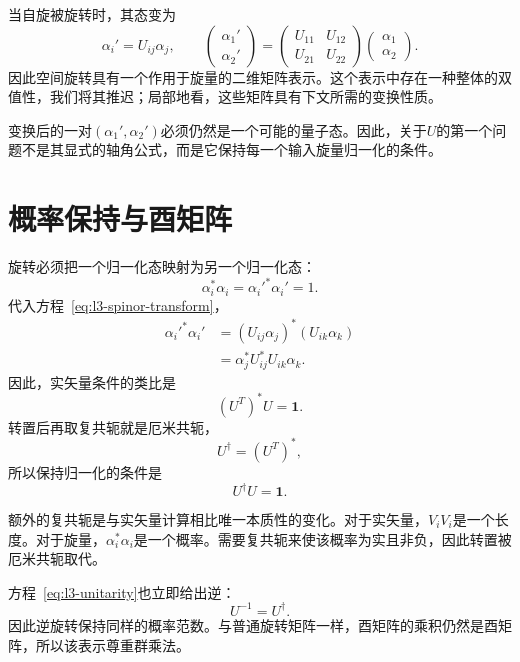 当自旋被旋转时，其态变为
\begin{equation}
\alpha_i'=U_{ij}\alpha_j,
\qquad
\begin{pmatrix}\alpha_1'\\\alpha_2'\end{pmatrix}
=
\begin{pmatrix}
U_{11}&U_{12}\\
U_{21}&U_{22}
\end{pmatrix}
\begin{pmatrix}\alpha_1\\\alpha_2\end{pmatrix}.
\label{eq:l3-spinor-transform}
\end{equation}
因此空间旋转具有一个作用于旋量的二维矩阵表示。这个表示中存在一种整体的双值性，我们将其推迟；局部地看，这些矩阵具有下文所需的变换性质。

变换后的一对\((\alpha_1',\alpha_2')\)必须仍然是一个可能的量子态。因此，关于\(U\)的第一个问题不是其显式的轴角公式，而是它保持每一个输入旋量归一化的条件。

\section{概率保持与酉矩阵}

旋转必须把一个归一化态映射为另一个归一化态：
\begin{equation}
\alpha_i^*\alpha_i=\alpha_i'^*\alpha_i'=1.
\end{equation}
代入方程~\eqref{eq:l3-spinor-transform}，
\begin{align}
\alpha_i'^*\alpha_i'
 &=(U_{ij}\alpha_j)^*(U_{ik}\alpha_k)\\
 &=\alpha_j^*U_{ij}^*U_{ik}\alpha_k.
\end{align}
因此，实矢量条件的类比是
\begin{equation}
(U^T)^*U=\boldsymbol 1.
\end{equation}
转置后再取复共轭就是厄米共轭，
\begin{equation}
U^\dagger=(U^T)^*,
\end{equation}
所以保持归一化的条件是
\begin{equation}
U^\dagger U=\boldsymbol 1.
\label{eq:l3-unitarity}
\end{equation}

额外的复共轭是与实矢量计算相比唯一本质性的变化。对于实矢量，\(V_iV_i\)是一个长度。对于旋量，\(\alpha_i^*\alpha_i\)是一个概率。需要复共轭来使该概率为实且非负，因此转置被厄米共轭取代。

方程~\eqref{eq:l3-unitarity}也立即给出逆：
\begin{equation}
U^{-1}=U^\dagger.
\end{equation}
因此逆旋转保持同样的概率范数。与普通旋转矩阵一样，酉矩阵的乘积仍然是酉矩阵，所以该表示尊重群乘法。

